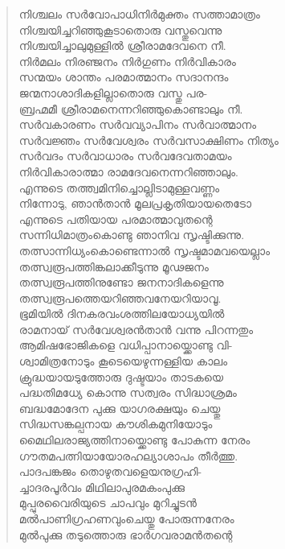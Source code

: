 \begin{verse}
നിശ്ചലം സര്‍വോപാധിനിര്‍മുക്തം സത്താമാത്രം\\
നിശ്ചയിച്ചറിഞ്ഞുകൂടാതൊരു വസ്തുവെന്നു\\
നിശ്ചയിച്ചാലുമുള്ളില്‍ ശ്രീരാമദേവനെ നീ.\\
നിര്‍മലം നിരഞ്ജനം നിര്‍ഗുണം നിര്‍വികാരം\\
സന്മയം ശാന്തം പരമാത്മാനം സദാനന്ദം\\
ജന്മനാശാദികളില്ലാതൊരു വസ്തു പര-\\
ബ്രഹ്മമീ ശ്രീരാമനെന്നറിഞ്ഞുകൊണ്ടാലും നീ.\\
സര്‍വകാരണം സര്‍വവ്യാപിനം സര്‍വാത്മാനം\\
സര്‍വജ്ഞം സര്‍വേശ്വരം സര്‍വസാക്ഷിണം നിത്യം\\
സര്‍വദം സര്‍വാധാരം സര്‍വദേവതാമയം\\
നിര്‍വികാരാത്മാ രാമദേവനെന്നറിഞ്ഞാലും.\\
എന്നുടെ തത്ത്വമിനിച്ചൊല്ലിടാമുള്ളവണ്ണം\\
നിന്നോടു, ഞാന്‍താന്‍ മൂലപ്രകൃതിയായതെടോ\\
എന്നുടെ പതിയായ പരമാത്മാവുതന്റെ\\
സന്നിധിമാത്രംകൊണ്ടു ഞാനിവ സൃഷ്ടിക്കുന്നു.\\
തത്സാന്നിധ്യംകൊണ്ടെന്നാല്‍ സൃഷ്ടമാമവയെല്ലാം\\
തത്സ്വരൂപത്തിങ്കലാക്കീടുന്നു മൂഢജനം\\
തത്സ്വരൂപത്തിനുണ്ടോ ജനനാദികളെന്നു\\
തത്സ്വരൂപത്തെയറിഞ്ഞവനേയറിയാവൂ.\\
ഭൂമിയില്‍ ദിനകരവംശത്തിലയോധ്യയില്‍\\
രാമനായ് സര്‍വേശ്വരന്‍താന്‍ വന്നു പിറന്നതും\\
ആമിഷഭോജികളെ വധിപ്പാനായ്ക്കൊണ്ടു വി-\\
ശ്വാമിത്രനോടും കൂടെയെഴുന്നള്ളിയ കാലം\\
ക്രുദ്ധയായടുത്തോരു ദുഷ്ടയാം താടകയെ\\
പദ്ധതിമധ്യേ കൊന്നു സത്വരം സിദ്ധാശ്രമം\\
ബദ്ധമോദേന പുക്കു യാഗരക്ഷയും ചെയ്തു\\
സിദ്ധസങ്കല്പനായ കൗശികമുനിയോടും\\
മൈഥിലരാജ്യത്തിനായ്ക്കൊണ്ടു പോകുന്ന നേരം\\
ഗൗതമപത്നിയായോരഹല്യാശാപം തീര്‍ത്തു.\\
പാദപങ്കജം തൊഴുതവളെയനുഗ്രഹി-\\
ച്ചാദരപൂര്‍വം മിഥിലാപുരമകംപുക്കു\\
മുപ്പുരവൈരിയുടെ ചാപവും മുറിച്ചുടന്‍\\
മല്‍പാണിഗ്രഹണവുംചെയ്തു പോരുന്നനേരം\\
മുല്‍പുക്കു തടുത്തൊരു ഭാര്‍ഗവരാമന്‍തന്റെ\\

\end{verse}
